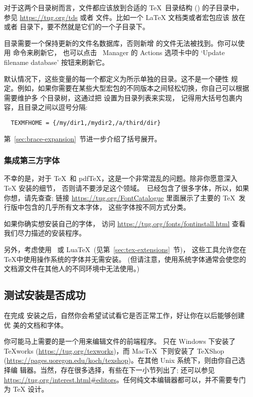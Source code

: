 \documentclass{article}
\begin{document}
对于这两个目录树而言，文件都应该放到合适的 \TeX\ 目录结构 (\TDS)
的子目录中，参见 \url{https://tug.org/tds} 或者
 文件。比如一个 \LaTeX{} 文档类或者宏包应该
放在  或者 
目录下，要不然就是它们的一个子目录下。

 目录需要一个保持更新的文件名数据库，否则新增
的文件无法被找到。你可以使用  命令来刷新它，
也可以点击 \TL\ Manager \GUI{} 的 Actions 选项卡中的
`Update filename database' 按钮来刷新它。

默认情况下，这些变量的每一个都定义为所示单独的目录。这不是一个硬性
规定。例如，如果你需要在某些大型宏包的不同版本之间轻松切换，你自己可以根据需要维护多
个目录树，这通过把  设置为目录列表来实现，
记得用大括号包裹内容，且目录之间以逗号分隔: 

\begin{verbatim}
  TEXMFHOME = {/my/dir1,/mydir2,/a/third/dir}
\end{verbatim}

第~\ref{sec:brace-expansion}~节进一步介绍了括号展开。

\subsubsection{集成第三方字体}

不幸的是，对于 \TeX\ 和 pdf\TeX，这是一个非常混乱的问题。除非你愿意深入 \TeX{} 安装的细节，
否则请不要涉足这个领域。\TL\ 已经包含了很多字体，所以，如果你想，请先查查; 
链接 \url{https://tug.org/FontCatalogue} 里面展示了主要的 \TeX\ 发行版中包含的几乎所有文本字体，
这些字体按不同方式分类。

如果你确实想安装自己的字体，
访问 \url{https://tug.org/fonts/fontinstall.html} 查看我们尽力描述的安装程序。

另外，考虑使用 \XeTeX\ 或 Lua\TeX\ (见第~\ref{sec:tex-extensions}~节)，
这些工具允许您在 \TeX 中使用操作系统的字体并无需安装。
(但请注意，使用系统字体通常会使您的文档源文件在其他人的不同环境中无法使用。)

\subsection{测试安装是否成功}
\label{sec:test-install}

在完成 \TL{} 安装之后，自然你会希望试试看它是否正常工作，好让你在以后能够创建优
美的文档和字体。

你可能马上需要的是一个用来编辑文件的前端程序。\TL{} 只在 Windows 下安装了
\TeX{}works (\url{https://tug.org/texworks})，而 Mac\TeX\ 下则安装了 TeXShop
(\url{https://pages.uoregon.edu/koch/texshop})。在其他 Unix 系统下，则由你自己选择编
辑器。当然，存在很多选择，有些在下一小节列出了; 还可以参见
\url{https://tug.org/interest.html#editors}。任何纯文本编辑器都可以，并不需要专门为
\TeX{} 设计。
\end{document}
